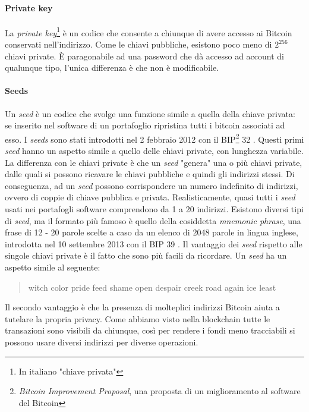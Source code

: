 \documentclass {article}
\begin{document}
\paragraph {Private key}

La \textit{private key}\footnote{In italiano "chiave privata"} è un codice che consente a chiunque di avere accesso ai Bitcoin conservati nell'indirizzo.
Come le chiavi pubbliche, esistono poco meno di $2^{256}$ chiavi private.
È paragonabile ad una password che dà accesso ad account di qualunque tipo, l'unica differenza è che non è modificabile.

\paragraph {Seeds}

Un \textit{seed} è un codice che svolge una funzione simile a quella della chiave privata: se inserito nel software di un portafoglio ripristina tutti i bitcoin associati ad esso.
I \textit{seeds} sono stati introdotti nel 2 febbraio 2012 con il BIP\footnote{\textit{Bitcoin Improvement Proposal}, una proposta di un miglioramento al software del Bitcoin} 32 \cite{bip32}.
Questi primi \textit{seed} hanno un aspetto simile a quello delle chiavi private, con lunghezza variabile.
La differenza con le chiavi private è che un \textit{seed} "genera" una o più chiavi private, dalle quali si possono ricavare le chiavi pubbliche e quindi gli indirizzi stessi.
Di conseguenza, ad un \textit{seed} possono corrispondere un numero indefinito di indirizzi, ovvero di coppie di chiave pubblica e privata.
Realisticamente, quasi tutti i \textit{seed} usati nei portafogli software comprendono da 1 a 20 indirizzi.
Esistono diversi tipi di \textit{seed}, ma il formato più famoso è quello della cosiddetta \textit{mnemonic phrase}, una frase di 12 - 20 parole scelte a caso da un elenco di 2048 parole in lingua inglese, introdotta nel 10 settembre 2013 con il BIP 39 \cite{bip39}.
Il vantaggio dei \textit{seed} rispetto alle singole chiavi private è il fatto che sono più facili da ricordare. Un \textit{seed} ha un aspetto simile al seguente:

\begin{quote}

witch color pride feed shame open despair creek road again ice least

\end{quote}
%
Il secondo vantaggio è che la presenza di molteplici indirizzi Bitcoin aiuta a tutelare la propria privacy.
Come abbiamo visto nella blockchain tutte le transazioni sono visibili da chiunque, così per rendere i fondi meno tracciabili si possono usare diversi indirizzi per diverse operazioni.
\end{document}
